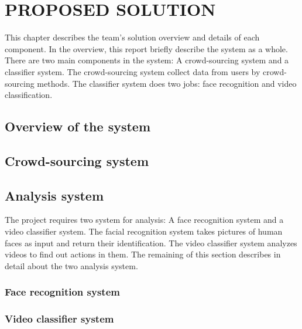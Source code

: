 \chapter{PROPOSED SOLUTION}
\label{chap:caseMedical}

This chapter describes the team's solution overview and details of each component. In the overview, this report briefly describe the system as a whole. There are two main components in the system: A crowd-sourcing system and a classifier system. The crowd-sourcing system collect data from users by crowd-sourcing methods. The classifier system does two jobs:  face recognition and video classification.
\section{Overview of the system}
\section{Crowd-sourcing system}
\section{Analysis system}
The project requires two system for analysis: A face recognition system and a video classifier system. The facial recognition system takes pictures of human faces as input and return their identification. The video classifier system analyzes videos to find out actions in them. The remaining of this section describes in detail about the two analysis system.
\subsection{Face recognition system}
\subsection{Video classifier system}
